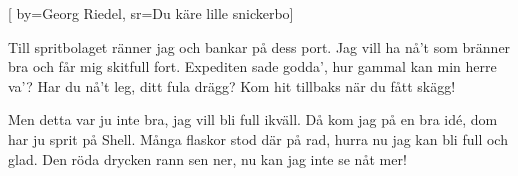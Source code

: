 [ 		
	by={Georg Riedel},					
	sr={Du käre lille snickerbo}]		
	
\beginverse*						
Till spritbolaget ränner jag 
och bankar på dess port. 
Jag vill ha nå't som bränner bra
och får mig skitfull fort.
Expediten sade godda',
hur gammal kan min herre va'?
Har du nå't leg, ditt fula drägg?
Kom hit tillbaks när du fått skägg!
\endverse						

\beginverse				
Men detta var ju inte bra,
jag vill bli full ikväll.
Då kom jag på en bra idé,
dom har ju sprit på Shell.
Många flaskor stod där på rad,
hurra nu jag kan bli full och glad.
Den röda drycken rann sen ner,
nu kan jag inte se nåt mer!
\endverse				
\endsong		
